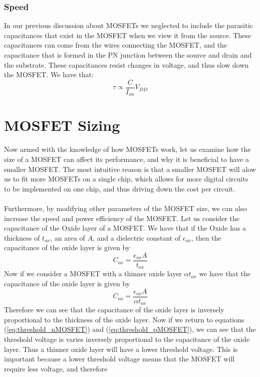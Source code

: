 \documentclass[
  reprint,
  amsmath,amssymb,
  aps
]{revtex4-1}
\begin{document}
\subsubsection*{Speed}
In our previous discussion about MOSFETs we neglected to include the parasitic capacitances that exist in the MOSFET when we 
view it from the source. These capacitances can come from the wires connecting the MOSFET, and the capacitance that is formed in the 
PN junction between the source and drain and the substrate. These capacitances resist changes in voltage, and thus slow down the 
MOSFET. We have that:
\begin{equation}
  \tau \propto \frac{C}{I_{on}}V_{DD}
\end{equation}
\section*{MOSFET Sizing}
Now armed with the knowledge of how MOSFETs work, let us examine how the size of a MOSFET can affect its performance, and why 
it is beneficial to have a smaller MOSFET. The most intuitive reason is that a smaller MOSFET will alow us to fit more MOSFETs
on a single chip, which allows for more digital circuits to be implemented on 
one chip, and thus driving down the cost per circuit.\\\\
Furthermore, by modifying other parameters of the MOSFET size, we
can also increase the speed and power efficiency of the MOSFET. 
Let us consider the capacitance of the Oxide layer of a MOSFET. We have that if the Oxide has a thickness of $t_{ox}$, 
an area of $A$, and a dielectric constant of $\epsilon_{ox}$, then the capacitance of the oxide layer is given by
\begin{equation}
  C_{ox} = \frac{\epsilon_{ox}A}{t_{ox}}
\end{equation}
Now if we consider a MOSFET with a thinner oxide layer $\alpha t_{ox}$ we 
have that the capacitance of the oxide layer is given by
\begin{equation}
  C_{ox} = \frac{\epsilon_{ox}A}{\alpha t_{ox}}
\end{equation}
Therefore we can see that the capacitance of the oxide layer is inversely proportional to the thickness of the oxide layer. Now if we return to 
equations (\ref{eq:threshold_nMOSFET}) and (\ref{eq:threshold_pMOSFET}), we can see that the threshold voltage is varies inversely proportional to the capacitance of the oxide layer. 
Thus a thinner oxide layer will have a lower threshold voltage. This is important because a lower threshold voltage means that the MOSFET will require less voltage, and therefore 
\end{document}
